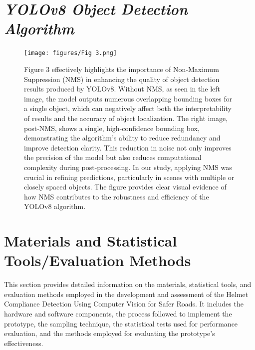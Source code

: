 \begin{refsection}
\section*{\textbf{\textit{ YOLOv8 Object Detection Algorithm}}}
\begin{figure}[ht]
    \centering
	\texttt{[image: figures/Fig 3.png]} 
	\caption[ Example of Non-Maximum Suppression ]{Figure 3 effectively highlights the importance of Non-Maximum Suppression (NMS) in enhancing the quality of object detection results produced by YOLOv8. Without NMS, as seen in the left image, the model outputs numerous overlapping bounding boxes for a single object, which can negatively affect both the interpretability of results and the accuracy of object localization. The right image, post-NMS, shows a single, high-confidence bounding box, demonstrating the algorithm’s ability to reduce redundancy and improve detection clarity. This reduction in noise not only improves the precision of the model but also reduces computational complexity during post-processing. In our study, applying NMS was crucial in refining predictions, particularly in scenes with multiple or closely spaced objects. The figure provides clear visual evidence of how NMS contributes to the robustness and efficiency of the YOLOv8 algorithm.}
	\label{fig:firstFig}
\end{figure}

\section*{Materials and Statistical Tools/Evaluation Methods}

This section provides detailed information on the materials, statistical tools, and evaluation methods employed in the development and assessment of the Helmet Compliance Detection Using Computer Vision for Safer Roads. It includes the hardware and software components, the process followed to implement the prototype, the sampling technique, the statistical tests used for performance evaluation, and the methods employed for evaluating the prototype's effectiveness.

\
\clearpage

\printbibliography[heading=subbibintoc, title={\texorpdfstring{\centering}{} Notes}]
\end{refsection}